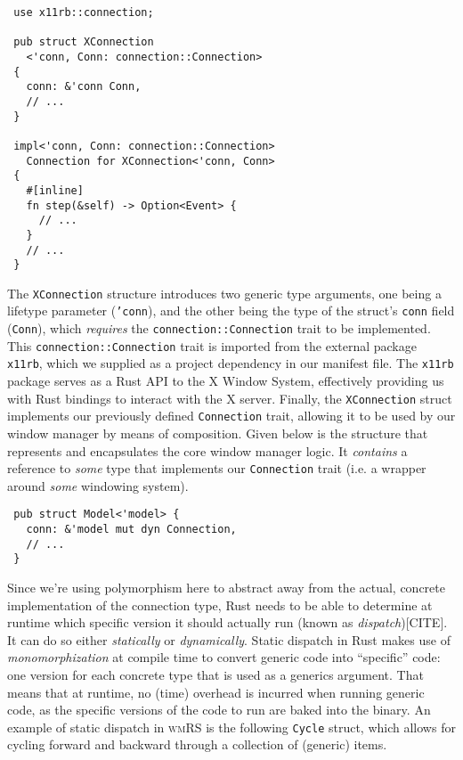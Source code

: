\begin{verbatim}
 use x11rb::connection;

 pub struct XConnection
   <'conn, Conn: connection::Connection>
 {
   conn: &'conn Conn,
   // ...
 }

 impl<'conn, Conn: connection::Connection>
   Connection for XConnection<'conn, Conn>
 {
   #[inline]
   fn step(&self) -> Option<Event> {
     // ...
   }
   // ...
 }
\end{verbatim}

The  \texttt{XConnection}  structure  introduces  two  generic  type  arguments,
one  being   a  lifetype  parameter   (\texttt{'conn}),  and  the   other  being
the   type  of   the   struct's  \texttt{conn}   field  (\texttt{Conn}),   which
\textit{requires} the  \texttt{connection::Connection} trait to  be implemented.
This \texttt{connection::Connection} trait is imported from the external package
\texttt{x11rb}, which we supplied as a  project dependency in our manifest file.
The  \texttt{x11rb}  package serves  as  a  Rust API  to  the  X Window  System,
effectively  providing us  with Rust  bindings to  interact with  the X  server.
Finally,  the  \texttt{XConnection}  struct implements  our  previously  defined
\texttt{Connection} trait, allowing it to be used by our window manager by means
of composition.  Given below is  the structure that represents  and encapsulates
the core window manager logic. It \textit{contains} a reference to \textit{some}
type  that  implements our  \texttt{Connection}  trait  (i.e. a  wrapper  around
\textit{some} windowing system).

\begin{verbatim}
 pub struct Model<'model> {
   conn: &'model mut dyn Connection,
   // ...
 }
\end{verbatim}


Since  we're  using  polymorphism  here   to  abstract  away  from  the  actual,
concrete  implementation  of  the  connection   type,  Rust  needs  to  be  able
to  determine  at  runtime  which   specific  version  it  should  actually  run
(known  as \textit{dispatch})[CITE].  It  can do  so either  \textit{statically}
or   \textit{dynamically}.    Static   dispatch    in   Rust   makes    use   of
\textit{monomorphization}  at   compile  time  to  convert   generic  code  into
``specific'' code: one version for each concrete type that is used as a generics
argument.  That means  that  at runtime,  no (time)  overhead  is incurred  when
running generic code, as the specific versions of the code to run are baked into
the binary.  An example  of static  dispatch in  \textsc{wmRS} is  the following
\texttt{Cycle} struct, which  allows for cycling forward and  backward through a
collection of (generic) items.

